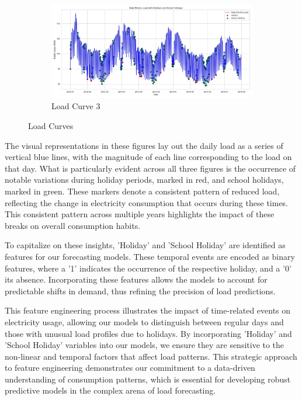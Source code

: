 \documentclass{article} %
\begin{document}
\begin{figure}[!htb]
    \\
    \begin{subfigure}[b]{\textwidth}
        \centering
        \includegraphics[width=\textwidth]{ressources/Holiday/lectricLoad_holiday(2).jpg}
        \caption{Load Curve 3}
        \label{fig:RawData3}
    \end{subfigure}
    \caption{Load Curves}
    \label{fig:RawData}
\end{figure}

The visual representations in these figures lay out the daily load as a series of vertical blue lines, with the magnitude of each line corresponding to the load on that day. What is particularly evident across all three figures is the occurrence of notable variations during holiday periods, marked in red, and school holidays, marked in green. These markers denote a consistent pattern of reduced load, reflecting the change in electricity consumption that occurs during these times. This consistent pattern across multiple years highlights the impact of these breaks on overall consumption habits. 

To capitalize on these insights, 'Holiday' and 'School Holiday' are identified as features for our forecasting models. These temporal events are encoded as binary features, where a '1' indicates the occurrence of the respective holiday, and a '0' its absence. Incorporating these features allows the models to account for predictable shifts in demand, thus refining the precision of load predictions. 

This feature engineering process illustrates the impact of time-related events on electricity usage, allowing our models to distinguish between regular days and those with unusual load profiles due to holidays. By incorporating 'Holiday' and 'School Holiday' variables into our models, we ensure they are sensitive to the non-linear and temporal factors that affect load patterns. This strategic approach to feature engineering demonstrates our commitment to a data-driven understanding of consumption patterns, which is essential for developing robust predictive models in the complex arena of load forecasting. 
\end{document}
